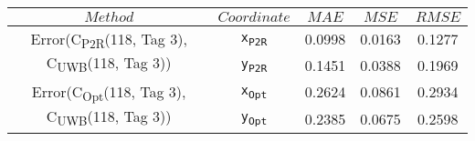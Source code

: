 \begin{table}[h]
\centering
\begin{tabular}{|c|c|c|c|c|}
\hline
$Method$ & $Coordinate$ & $MAE$ & $MSE$ & $RMSE$ \\
\hline
\multirow{2}{*}{{\footnotesize Error(C\textsubscript{P2R}(118, Tag 3), C\textsubscript{UWB}(118, Tag 3))}} & \texttt{x\textsubscript{P2R}} & 0.0998 & 0.0163 & 0.1277 \\
& \texttt{y\textsubscript{P2R}} & 0.1451 & 0.0388 & 0.1969 \\
\hline
\multirow{2}{*}{{\footnotesize Error(C\textsubscript{Opt}(118, Tag 3), C\textsubscript{UWB}(118, Tag 3))}} & \texttt{x\textsubscript{Opt}} & 0.2624 & 0.0861 & 0.2934 \\
& \texttt{y\textsubscript{Opt}} & 0.2385 & 0.0675 & 0.2598 \\
\hline
\end{tabular}
\end{table}
